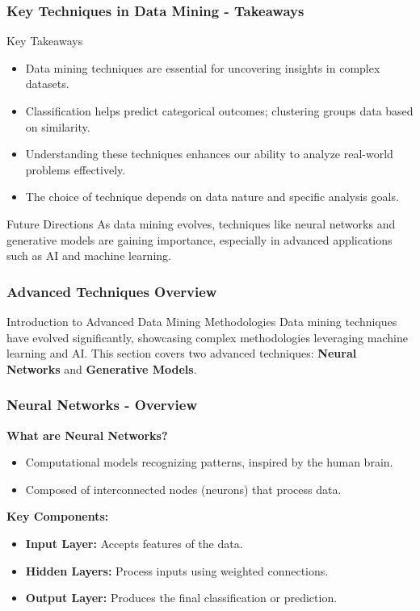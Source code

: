 \documentclass[aspectratio=169]{beamer}
\begin{document}
\begin{frame}[fragile]
    \frametitle{Key Techniques in Data Mining - Takeaways}
    \begin{block}{Key Takeaways}
        \begin{itemize}
            \item Data mining techniques are essential for uncovering insights in complex datasets.
            \item Classification helps predict categorical outcomes; clustering groups data based on similarity.
            \item Understanding these techniques enhances our ability to analyze real-world problems effectively.
            \item The choice of technique depends on data nature and specific analysis goals.
        \end{itemize}
    \end{block}
    
    \begin{block}{Future Directions}
        As data mining evolves, techniques like neural networks and generative models are gaining importance, especially in advanced applications such as AI and machine learning.
    \end{block}
\end{frame}

\begin{frame}[fragile]
    \frametitle{Advanced Techniques Overview}
    \begin{block}{Introduction to Advanced Data Mining Methodologies}
        Data mining techniques have evolved significantly, showcasing complex methodologies leveraging machine learning and AI. This section covers two advanced techniques: \textbf{Neural Networks} and \textbf{Generative Models}.
    \end{block}
\end{frame}

\begin{frame}[fragile]
    \frametitle{Neural Networks - Overview}
    \textbf{What are Neural Networks?}
    \begin{itemize}
        \item Computational models recognizing patterns, inspired by the human brain.
        \item Composed of interconnected nodes (neurons) that process data.
    \end{itemize}

    \textbf{Key Components:}
    \begin{itemize}
        \item \textbf{Input Layer:} Accepts features of the data.
        \item \textbf{Hidden Layers:} Process inputs using weighted connections.
        \item \textbf{Output Layer:} Produces the final classification or prediction.
    \end{itemize}
\end{frame}
\end{document}
